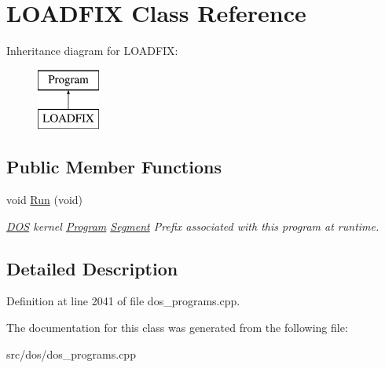\hypertarget{classLOADFIX}{\section{L\-O\-A\-D\-F\-I\-X Class Reference}
\label{classLOADFIX}
}
Inheritance diagram for L\-O\-A\-D\-F\-I\-X\-:\begin{figure}[H]
\begin{center}
\leavevmode
\includegraphics[height=2.000000cm]{classLOADFIX}
\end{center}
\end{figure}
\subsection*{Public Member Functions}
\begin{DoxyCompactItemize}
\item 
\hypertarget{classLOADFIX_a2edbc9814c14ed39a0410473df0bcc36}{void \hyperlink{classLOADFIX_a2edbc9814c14ed39a0410473df0bcc36}{Run} (void)}\label{classLOADFIX_a2edbc9814c14ed39a0410473df0bcc36}

\begin{DoxyCompactList}\small\item\em \hyperlink{classDOS}{D\-O\-S} kernel \hyperlink{classProgram}{Program} \hyperlink{structSegment}{Segment} Prefix associated with this program at runtime. \end{DoxyCompactList}\end{DoxyCompactItemize}


\subsection{Detailed Description}


Definition at line 2041 of file dos\-\_\-programs.\-cpp.



The documentation for this class was generated from the following file\-:\begin{DoxyCompactItemize}
\item 
src/dos/dos\-\_\-programs.\-cpp\end{DoxyCompactItemize}
